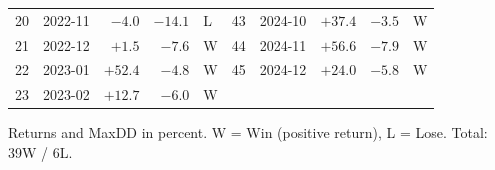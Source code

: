 \documentclass[12pt,a4paper]{article}
\begin{document}
\begin{table}[htbp]
\begin{tabular}{rlrrl|rlrrl}
20 & 2022-11 & $-4.0$   & $-14.1$ & L & 43 & 2024-10 & $+37.4$ & $-3.5$ & W \\
21 & 2022-12 & $+1.5$   & $-7.6$ & W & 44 & 2024-11 & $+56.6$ & $-7.9$ & W \\
22 & 2023-01 & $+52.4$  & $-4.8$ & W & 45 & 2024-12 & $+24.0$ & $-5.8$ & W \\
23 & 2023-02 & $+12.7$  & $-6.0$ & W &    &         &         &        &   \\
\bottomrule
\end{tabular}
\begin{tablenotes}
\small
\item Returns and MaxDD in percent. W = Win (positive return), L = Lose. Total: 39W / 6L.
\end{tablenotes}
\end{table}
\end{document}
